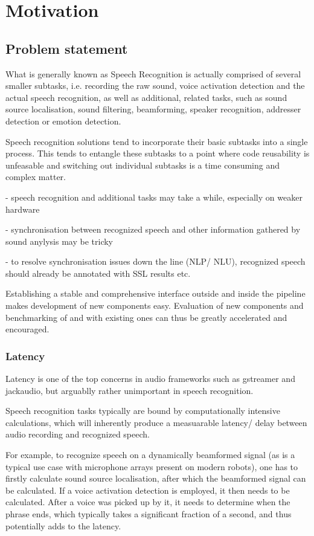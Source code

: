 
\chapter{Motivation}

\section{Problem statement} %
What is generally known as Speech Recognition is actually comprised of several smaller subtasks, i.e. recording the raw sound, voice activation detection and the actual speech recognition, as well as additional, related tasks, such as sound source localisation, sound filtering, beamforming, speaker recognition, addresser detection or emotion detection. %

Speech recognition solutions tend to incorporate their basic subtasks into a single process. This tends to entangle these subtasks to a point where code reusability is unfeasable and switching out individual subtasks is a time consuming and complex matter.

- speech recognition and additional tasks may take a while, especially on weaker hardware

- synchronisation between recognized speech and other information gathered by sound anylysis may be tricky

- to resolve synchronisation issues down the line (NLP/ NLU), recognized speech should already be annotated with SSL results etc.

Establishing a stable and comprehensive interface outside and inside the pipeline makes development of new components easy. 
Evaluation of new components and benchmarking of and with existing ones can thus be greatly accelerated and encouraged.%

\subsection{Latency}
Latency is one of the top concerns in audio frameworks such as gstreamer and jackaudio, but arguablly rather unimportant in speech recognition. 
	
Speech recognition tasks typically are bound by computationally intensive calculations, which will inherently produce a measuarable latency/ delay between audio recording and recognized speech.  
	
For example, to recognize speech on a dynamically beamformed signal (as is a typical use case with microphone arrays present on modern robots), one has to firstly calculate sound source localisation, after which the beamformed signal can be calculated.
If a voice activation detection is employed, it then needs to be calculated. 
After a voice was picked up by it, it needs to determine when the phrase ends, which typically takes a significant fraction of a second, and thus potentially adds to the latency. 
	
